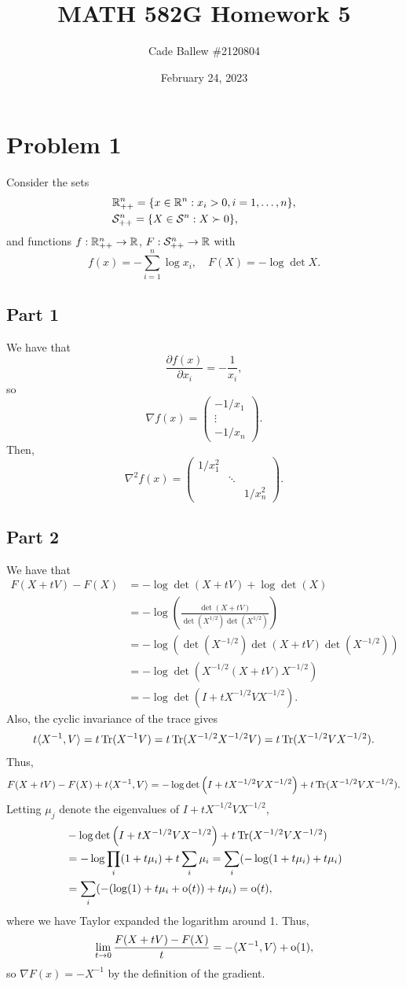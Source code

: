 \documentclass{article}
\title{MATH 582G Homework 5}
\author{Cade Ballew \#2120804}
\date{February 24, 2023}
\begin{document}
	
\maketitle
	
\section{Problem 1}
Consider the sets
\begin{align*}
&\mathbb{R}^n_{++}=\{x\in\mathbb{R}^n:x_i>0,i=1,\ldots,n\},\\
&\mathcal{S}^n_{++}=\{X\in\mathcal S^n:X\succ0\},
\end{align*}
and functions $f:\mathbb{R}^n_{++}\to\mathbb{R}$, $F:\mathcal{S}^n_{++}\to\mathbb{R}$ with
\[
f(x)=-\sum_{i=1}^n\log x_i,\quad F(X)=-\log\det X.
\]
\subsection{Part 1}
We have that
\[
\frac{\partial f(x)}{\partial x_i}=-\frac{1}{x_i},
\]
so 
\[
\nabla f(x)=\begin{pmatrix}
	-1/x_1\\
	\vdots\\
	-1/x_n
\end{pmatrix}.
\]
Then, 
\[
\nabla^2f(x)=\begin{pmatrix}
	1/x_1^2\\
	&\ddots\\
	&&1/x_n^2
\end{pmatrix}.
\]
\subsection{Part 2}
We have that 
\begin{align*}
F(X+tV)-F(X)&=-\log\det(X+tV)+\log\det(X)\\&=-\log\left(\frac{\det(X+tV)}{\det(X^{1/2})\det(X^{1/2})}\right)\\&=
-\log\left(\det(X^{-1/2})\det(X+tV)\det(X^{-1/2})\right)\\&=
-\log\det\left(X^{-1/2}(X+tV)X^{-1/2}\right)\\&=-\log\det\left(I+tX^{-1/2}VX^{-1/2}\right).
\end{align*}
Also, the cyclic invariance of the trace gives
\begin{align*}
t\langle X^{-1},V\rangle=t\operatorname{Tr}(X^{-1}V)=t\operatorname{Tr}(X^{-1/2}X^{-1/2}V)=t\operatorname{Tr}(X^{-1/2}VX^{-1/2}).
\end{align*}
Thus,
\[
F(X+tV)-F(X)+t\langle X^{-1},V\rangle=-\log\det\left(I+tX^{-1/2}VX^{-1/2}\right)+t\operatorname{Tr}(X^{-1/2}VX^{-1/2}).
\]
Letting $\mu_j$ denote the eigenvalues of $I+tX^{-1/2}VX^{-1/2}$, 
\begin{align*}
&-\log\det\left(I+tX^{-1/2}VX^{-1/2}\right)+t\operatorname{Tr}(X^{-1/2}VX^{-1/2})\\&=-\log\prod_i(1+t\mu_i)+t\sum_i\mu_i=
\sum_i(-\log(1+t\mu_i)+t\mu_i)\\&=
\sum_i(-(\log(1)+t\mu_i+\operatorname{o}(t))+t\mu_i)=\operatorname{o}(t),
\end{align*}
where we have Taylor expanded the logarithm around 1. Thus,
\[
\lim_{t\to0}\frac{F(X+tV)-F(X)}{t}=-\langle X^{-1},V\rangle+\operatorname{o}(1),
\]
so $\nabla F(x)=-X^{-1}$ by the definition of the gradient.
\end{document}
